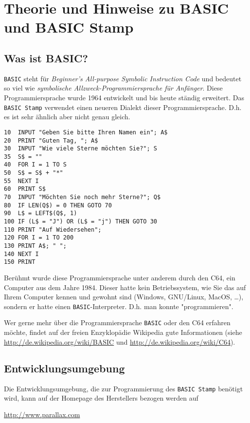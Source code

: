 
\section{Theorie und Hinweise zu BASIC und BASIC Stamp}

\subsection{Was ist BASIC?}
\verb|BASIC| steht für 
\emph{Beginner's All-purpose Symbolic Instruction Code}
und bedeutet so viel wie
\emph{symbolische Allzweck-Programmiersprache für Anfänger}.
Diese Programmiersprache wurde 1964 entwickelt und bis heute 
ständig erweitert. Das \verb|BASIC Stamp| verwendet einen neueren
Dialekt dieser Programmiersprache. D.h. es ist sehr ähnlich aber 
nicht genau gleich.

\begin{lstlisting}[label=Pure BASIC Code, caption=Echter BASIC Code]
10  INPUT "Geben Sie bitte Ihren Namen ein"; A$
20  PRINT "Guten Tag, "; A$
30  INPUT "Wie viele Sterne möchten Sie?"; S
35  S$ = ""
40  FOR I = 1 TO S
50  S$ = S$ + "*"
55  NEXT I
60  PRINT S$
70  INPUT "Möchten Sie noch mehr Sterne?"; Q$
80  IF LEN(Q$) = 0 THEN GOTO 70
90  L$ = LEFT$(Q$, 1)
100 IF (L$ = "J") OR (L$ = "j") THEN GOTO 30
110 PRINT "Auf Wiedersehen";
120 FOR I = 1 TO 200
130 PRINT A$; " ";
140 NEXT I
150 PRINT
\end{lstlisting}

\noindent
Berühmt wurde diese Programmiersprache unter anderem durch den C64,
ein Computer aus dem Jahre 1984. Dieser hatte kein Betriebssystem,
wie Sie das auf Ihrem Computer kennen und gewohnt sind 
(Windows, GNU/Linux, MacOS, \dots), sondern er hatte einen 
\verb|BASIC|-Interpreter. D.h. man konnte "programmieren". 

Wer gerne mehr über die Programmiersprache \verb|BASIC| oder den C64
erfahren möchte,
findet auf der freien Enzyklopädie Wikipedia gute Informationen
(siehe \url{http://de.wikipedia.org/wiki/BASIC} und 
\url{http://de.wikipedia.org/wiki/C64}).

\subsection{Entwicklungsumgebung}
Die Entwicklungsumgebung, die zur Programmierung des \verb|BASIC Stamp|
benötigt wird, kann auf der Homepage des Herstellers bezogen werden auf
\begin{center}
\url{http://www.parallax.com}
\end{center}

